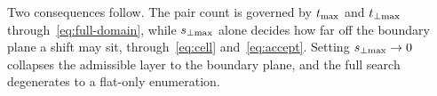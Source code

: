 Two consequences follow. The pair count is governed by $t_{\max}$ and $t_{\perp\max}$
through~\eqref{eq:full-domain}, while $s_{\perp\max}$ alone decides how far off the
boundary plane a shift may sit, through~\eqref{eq:cell}
and~\eqref{eq:accept}. Setting $s_{\perp\max} \to 0$ collapses the admissible layer to
the boundary plane, and the full search degenerates to a flat-only enumeration.


